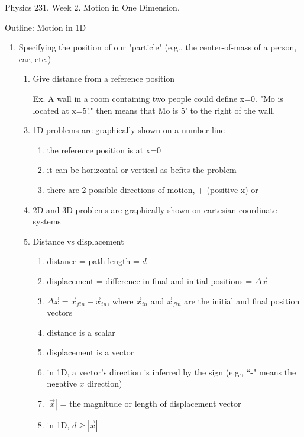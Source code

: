 \documentclass[12pt,epsf]{article}
\begin{document}
%

\noindent 

\begin{centering}
{\Huge Physics 231.  Week 2. Motion in One Dimension. }
\end{centering}
\bigskip 

\Large
Outline: Motion in 1D

\begin{enumerate}
\item Specifying the position of our "particle" (e.g., the center-of-mass
of a person, car, etc.)
\begin{enumerate}
	\item Give distance from a reference position
        \item [Ex.] A wall in a room containing two people could define x=0.  "Mo is located at x=5'." then means that Mo is 5' to the right of the wall.
	\item 1D problems are graphically shown on a number line 
	\begin{enumerate}
          \item the reference position is at x=0
	  \item it can be horizontal or vertical as befits the problem
	  \item there are 2 possible directions of motion, + (positive x) or -
	\end{enumerate}
	\item 2D and 3D problems are graphically shown on cartesian coordinate systems
	\item Distance vs displacement
	\begin{enumerate}
	  \item distance = path length = $d$
	  \item displacement = difference in final and initial positions = $\Delta \vec{x}$
	  \item $\Delta \vec{x} = \vec{x}_{fin} - \vec{x}_{in}$, where $\vec{x}_{in}$
and $\vec{x}_{fin}$ are the initial and final position vectors
	  \item distance is a scalar
	  \item displacement is a vector
	  \item in 1D, a vector's direction is inferred by the sign (e.g., 
``-" means the negative $x$ direction)
	  \item $\left| \vec{x} \right|$ = the magnitude or length of displacement vector
	  \item in 1D, $d \geq \left|\vec{x}\right|$ 

\end{enumerate}
\end{enumerate}
\end{enumerate}
\end{document}
